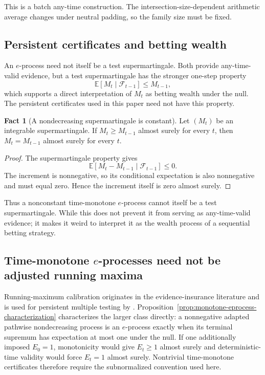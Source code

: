 \documentclass[11pt]{article}
\numberwithin{equation}{section}
\theoremstyle{plain}
\theoremstyle{definition}
\newtheorem{fact}[theorem]{Fact}
\newcommand{\E}{\mathbb E}
\newcommand{\F}{\mathcal F}
\begin{document}
This is a batch any-time construction. The intersection-size-dependent arithmetic average changes under neutral padding, so the family size must be fixed.

\subsection{Persistent certificates and betting wealth}\label{sup:betting}

An $e$-process need not itself be a test supermartingale. Both provide any-time-valid evidence, but a test supermartingale has the stronger one-step property
\[
\E[M_t\mid\F_{t-1}]\leq M_{t-1},
\]
which supports a direct interpretation of $M_t$ as betting wealth under the null. The persistent certificates used in this paper need not have this property.

\begin{fact}[A nondecreasing supermartingale is constant]\label{sup:prop:constant}
	Let $(M_t)$ be an integrable supermartingale. If $M_t\geq M_{t-1}$ almost surely for every $t$, then $M_t=M_{t-1}$ almost surely for every $t$.
\end{fact}

\begin{proof}
	The supermartingale property gives
	\[
	\E[M_t-M_{t-1}\mid\F_{t-1}]\leq0.
	\]
	The increment is nonnegative, so its conditional expectation is also nonnegative and must equal zero. Hence the increment itself is zero almost surely.
\end{proof}

Thus a nonconstant time-monotone $e$-process cannot itself be a test supermartingale. While this does not prevent it from serving as any-time-valid evidence; it makes it weird to interpret it as the wealth process of a sequential betting strategy.

\subsection{Time-monotone \texorpdfstring{$e$}{e}-processes need not be adjusted running maxima}\label{sup:nonadjuster}

Running-maximum calibration originates in the evidence-insurance literature \citep{DawidEtAl2011Evidence,ShaferEtAl2011TestMartingales} and is used for persistent multiple testing by \citet{TavyrikovGoemanDeHeide2026}. Proposition~\ref{prop:monotone-eprocess-characterization} characterizes the larger class directly: a nonnegative adapted pathwise nondecreasing process is an $e$-process exactly when its terminal supremum has expectation at most one under the null. If one additionally imposed $E_0=1$, monotonicity would give $E_t\geq1$ almost surely and deterministic-time validity would force $E_t=1$ almost surely. Nontrivial time-monotone certificates therefore require the subnormalized convention used here.
\end{document}
